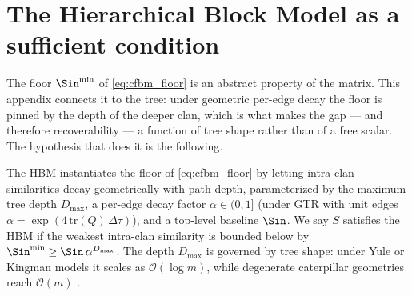 \section{The Hierarchical Block Model as a sufficient condition}\label{app:hbm}
The floor $\Sin^{\min}$ of \eqref{eq:cfbm_floor} is an abstract property of the
matrix. This appendix connects it to the tree: under geometric per-edge decay the
floor is pinned by the depth of the deeper clan, which is what makes the
gap --- and therefore recoverability --- a function of tree shape rather than of a
free scalar. The hypothesis that does it is the following.

\begin{assumption}\label{asm:hbm}
The HBM instantiates the floor of \eqref{eq:cfbm_floor} by letting intra-clan
similarities decay geometrically with
path depth, parameterized by the maximum tree depth $D_{\max}$, a per-edge decay
factor $\alpha\in(0,1]$ (under GTR with unit edges $\alpha=\exp(4\,\mathrm{tr}(Q)\,\Delta\tau)$),
and a top-level baseline $\Sin$. We say $S$ satisfies the HBM if the weakest
intra-clan similarity is bounded below by
$\Sin^{\min}\ge\Sin\,\alpha^{D_{\max}}$. The depth $D_{\max}$ is governed by tree
shape: under Yule or Kingman models it scales as $\mathcal O(\log m)$, while
degenerate caterpillar geometries reach $\mathcal O(m)$
\cite{steel2001properties, blum2006which}.
\end{assumption}

